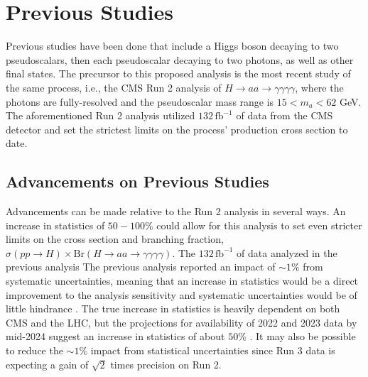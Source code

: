 \documentclass[12pt]{article}
\begin{document}
\section{Previous Studies}
Previous studies have been done that include a Higgs boson decaying to two pseudoscalars, then each pseudoscalar decaying to two photons, as well as other final states. The precursor to this proposed analysis is the most recent study of the same process, i.e., the CMS Run 2 analysis of $H\rightarrow aa \rightarrow \gamma\gamma\gamma\gamma$, where the photons are fully-resolved and the pseudoscalar mass range is $15 < m_a < 62$ GeV. The aforementioned Run 2 analysis utilized $132\, \mathrm{fb}^{-1}$ of data from the CMS detector and set the strictest limits on the process' production cross section to date.\par

\subsection{Advancements on Previous Studies}
Advancements can be made relative to the Run 2 analysis in several ways. An increase in statistics of $50-100\%$ could allow for this analysis to set even stricter limits on the cross section and branching fraction, $\sigma(pp \rightarrow H) \times \mathrm{Br}(H\rightarrow aa \rightarrow \gamma\gamma\gamma\gamma)$. The $132\, \mathrm{fb}^{-1}$ of data analyzed in the previous analysis  The previous analysis reported an impact of ${\sim}1\%$ from systematic uncertainties, meaning that an increase in statistics would be a direct improvement to the analysis sensitivity and systematic uncertainties would be of little hindrance \cite{Run2_analysis}. The true increase in statistics is heavily dependent on both CMS and the LHC, but the projections for availability of 2022 and 2023 data by mid-2024 suggest an increase in statistics of about $50\%$ \cite{PC_CMS_Week}. It may also be possible to reduce the ${\sim}1\%$ impact from statistical uncertainties since Run 3 data is expecting a gain of $\sqrt{2}$ times precision on Run 2.\par
\end{document}
